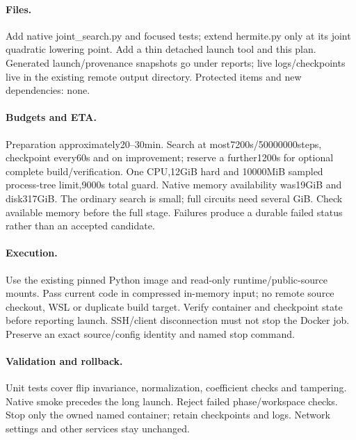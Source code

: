 \documentclass{article}
\begin{document}
\paragraph{Files.} Add native joint\_search.py and focused tests; extend
hermite.py only at its joint quadratic lowering point. Add a thin detached
launch tool and this plan. Generated launch/provenance snapshots go under
reports; live logs/checkpoints live in the existing remote output directory.
Protected items and new dependencies: none.
\paragraph{Budgets and ETA.} Preparation approximately20--30min. Search at
most7200s/50000000steps, checkpoint every60s and on improvement; reserve a
further1200s for optional complete build/verification. One CPU,12GiB hard and
10000MiB sampled process-tree limit,9000s total guard. Native memory availability
was19GiB and disk317GiB. The ordinary search is small; full circuits need several
GiB. Check available memory before the full stage. Failures produce a durable
failed status rather than an accepted candidate.
\paragraph{Execution.} Use the existing pinned Python image and read-only
runtime/public-source mounts. Pass current code in compressed in-memory input;
no remote source checkout, WSL or duplicate build target. Verify container and
checkpoint state before reporting launch. SSH/client disconnection must not stop
the Docker job. Preserve an exact source/config identity and named stop command.
\paragraph{Validation and rollback.} Unit tests cover flip invariance,
normalization, coefficient checks and tampering. Native smoke precedes the long
launch. Reject failed phase/workspace checks. Stop only the owned named container;
retain checkpoints and logs. Network settings and other services stay unchanged.
\begin{center}\end{center}
\end{document}
